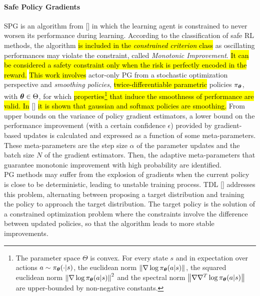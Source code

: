 \paragraph{Safe Policy Gradients} \label{subsec:safepg}
\acf{SPG} is an algorithm from [\cite{papini2019}] in which the learning agent is constrained to never worsen its performance during learning. According to the classification of safe \ac{RL} methods, the algorithm \hl{is included in the \emph{constrained criterion} class} as oscillating performances may violate the constraint, called \emph{Monotonic Improvement}. \hl{It can be considered a safety constraint only when the risk is perfectly encoded in the reward.} \hl{This work involves} actor-only \ac{PG} from a stochastic optimization perspective and \emph{smoothing policies}, \ie \hl{twice-differentiable parametric} policies $\pi_{\boldsymbol{\theta}}$, with $\boldsymbol{\theta} \in \Theta$, for which \hl{properties\footnote{The parameter space $\Theta$ is convex. For every state $s$ and in expectation over actions $a \sim \pi_{\boldsymbol{\theta}}(\cdot|s)$, the euclidean norm $\left\|\nabla \log \pi_{\boldsymbol{\theta}}(a|s)\right\|_{}$, the squared euclidean norm $\left\|\nabla \log \pi_{\boldsymbol{\theta}}(a|s)\right\|_{}^2$ and the spectral norm $\left\|\nabla\nabla^T \log \pi_{\boldsymbol{\theta}}(a|s)\right\|_{}$ are upper-bounded by non-negative constants.} that induce the smoothness of performance are valid. In} [\cite{papini2019}] \hl{it is shown that gaussian and softmax policies are smoothing.} From upper bounds on the variance of policy gradient estimators, a lower bound on the performance improvement (with a certain confidence $\epsilon$) provided by gradient-based updates is calculated and expressed as a function of some meta-parameters. These meta-parameters are the step size $\alpha$ of the parameter updates and the batch size $N$ of the gradient estimators. Then, the adaptive meta-parameters that guarantee monotonic improvement with high probability are identified.\\
\newline 
\ac{PG} methods may suffer from the explosion of gradients when the current policy is close to be deterministic, leading to unstable training process. \acf{TDL} [\cite{DBLP:journals/corr/abs-1905-11041}] addresses this problem, alternating between proposing a target distribution and training the policy to approach the target distribution. The target policy is the solution of a constrained optimization problem where the constraints involve the difference between updated policies, so that the algorithm leads to more stable improvements.